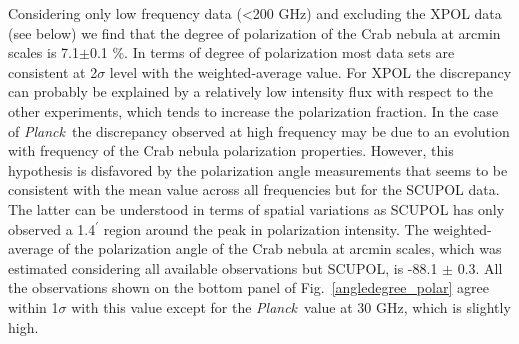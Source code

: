 \documentclass[twocolumn,traditabstract]{aa}
\def\NIKA{\textit{NIKA}}
\def\Planck{\textit{Planck}}
\def\WMAP{\textit{WMAP}}
\begin{document}
Considering only low frequency data (\textless 200 GHz) and excluding the XPOL data (see below) we find that the degree of polarization of the Crab nebula at arcmin scales is 7.1$\pm$0.1 \%.
In terms of degree of polarization most data sets are consistent at 2$\sigma$ level with the weighted-average value. For XPOL the discrepancy can probably be explained by a relatively low intensity flux with respect to the other experiments, which tends to increase the polarization fraction. In the case of \Planck\ the discrepancy observed at high frequency may be due to an evolution with frequency of the Crab nebula polarization properties.
However, this hypothesis is disfavored by the polarization
angle measurements that seems to be consistent with the mean value across all frequencies but for the SCUPOL data. The latter can be understood in terms of spatial variations as SCUPOL has only observed a 1.4$^\prime$ region around the peak in polarization intensity. 
The weighted-average of the polarization angle of the Crab nebula at arcmin scales, which was estimated considering all available observations but SCUPOL, is -88.1 $\pm$ 0.3.
All the observations shown on the bottom panel of Fig.~\ref{angledegree_polar} agree within 1$\sigma$ with this value except for the \Planck\ value at 30 GHz, which is slightly high. 
\end{document}
